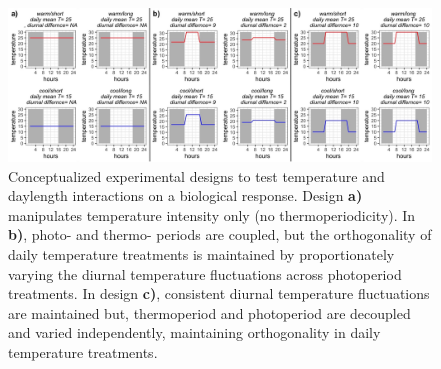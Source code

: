 \documentclass[11pt]{article}
\begin{document}
\begin{figure}[h!]
    \centering
 \includegraphics[width=\textwidth]{..//Plots/periodicity_figures/designs.jpeg}
    \caption{Conceptualized experimental designs to test temperature and daylength interactions on a biological response. Design \textbf{a)}  manipulates temperature intensity only (no thermoperiodicity). %
    In \textbf{b)}, photo- and thermo- periods are coupled, but the orthogonality of daily temperature treatments is maintained by proportionately varying the diurnal temperature fluctuations across photoperiod treatments. %
    In design \textbf{c)}, consistent diurnal temperature fluctuations are maintained but, thermoperiod and photoperiod are decoupled and varied independently, maintaining orthogonality in daily temperature treatments.}%
    \label{fig:ortho}
\end{figure}
 
\end{document}
